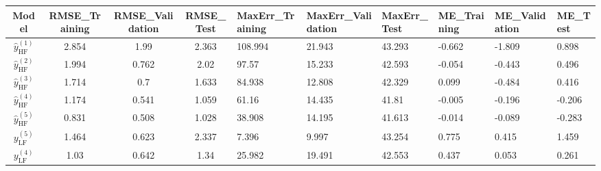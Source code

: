\begin{tabular}{cccc}
\toprule
Model & RMSE_Training & RMSE_Validation & RMSE_Test & MaxErr_Training & MaxErr_Validation & MaxErr_Test & ME_Training & ME_Validation & ME_Test \\
\midrule
$\hat{y}_\text{HF}^{(1)}$ & 2.854 & 1.99 & 2.363 & 108.994 & 21.943 & 43.293 & -0.662 & -1.809 & 0.898 \\
$\hat{y}_\text{HF}^{(2)}$ & 1.994 & 0.762 & 2.02 & 97.57 & 15.233 & 42.593 & -0.054 & -0.443 & 0.496 \\
$\hat{y}_\text{HF}^{(3)}$ & 1.714 & 0.7 & 1.633 & 84.938 & 12.808 & 42.329 & 0.099 & -0.484 & 0.416 \\
$\hat{y}_\text{HF}^{(4)}$ & 1.174 & 0.541 & 1.059 & 61.16 & 14.435 & 41.81 & -0.005 & -0.196 & -0.206 \\
$\hat{y}_\text{HF}^{(5)}$ & 0.831 & 0.508 & 1.028 & 38.908 & 14.195 & 41.613 & -0.014 & -0.089 & -0.283 \\
${y}_\mathrm{LF}^{(5)}$ & 1.464 & 0.623 & 2.337 & 7.396 & 9.997 & 43.254 & 0.775 & 0.415 & 1.459 \\
${y}_\mathrm{LF}^{(4)}$ & 1.03 & 0.642 & 1.34 & 25.982 & 19.491 & 42.553 & 0.437 & 0.053 & 0.261 \\
\bottomrule
\end{tabular}
